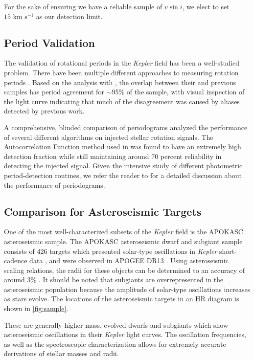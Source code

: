 \documentclass[manuscript]{aastex6}
\newcommand{\vsini}{\ensuremath{v \sin i}}
\newcommand{\Kepler}{\mbox{\textit{Kepler}}}
\newcommand{\kms}{\textrm{ km~s}\ensuremath{^{-1}}}
\begin{document}
For the sake of ensuring we have a reliable sample of \vsini{}, we elect to set
\(15 \kms\) as our detection limit.

\subsection{Period Validation}

The validation of rotational periods in the \Kepler{} field has been a
well-studied problem. There have been multiple different approaches to
measuring rotation periods \citep{Reinhold13,Nielsen13,McQuillan14,Garcia14}.
Based on the analysis with \citet{McQuillan14}, the overlap between their
and previous samples has period agreement for \(\sim\)95\% of the
sample, with visual 
inspection of the light curve indicating that much of the disagreement was 
caused by aliases detected by previous work. 

A comprehensive, blinded comparison of periodograms analyzed the performance of
several different algorithms on injected stellar rotation \citep{Aigrain15} 
signals. The Autocorrelation Function method used in \citet{McQuillan14} was 
found to have an extremely high detection fraction while still maintaining 
around 70 percent reliability in detecting the injected signal. Given the 
intensive study of different photometric period-detection routines, we refer 
the reader to \citet{Aigrain15} for a detailed discussion about the 
performance of periodograms.

\subsection{Comparison for Asteroseismic Targets}
\label{sec:astero}


One of the most well-characterized subsets of the \Kepler{} field is the
APOKASC asteroseismic sample. The APOKASC asteroseismic dwarf and subgiant 
sample consists of 426 targets which presented solar-type oscillations in 
\Kepler{} short-cadence data \citep{Chaplin11}, and were observed in APOGEE DR13
\citep{Majewski17}. Using asteroseismic scaling relations, the radii
for these objects can be determined to an accuracy of around 3\%
\citep{Serenelli17}. It should be noted that subgiants are overrepresented in
the asteroseismic population because the amplitude of solar-type oscillations 
increases as stars evolve. The locations of the asteroseismic targets in an HR
diagram is shown in \cref{fig:sample}.

These are generally higher-mass, evolved dwarfs
and subgiants which show asteroseismic oscillations in their \Kepler{} light
curves. The oscillation frequencies, as well as the spectroscopic
characterization allows for extremely accurate derivations of stellar masses
and radii.
\end{document}
